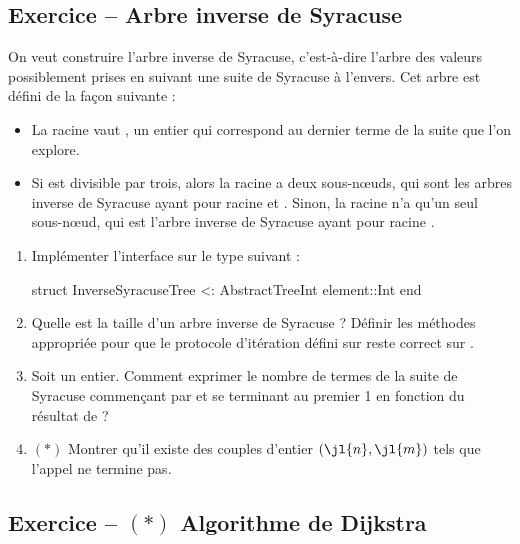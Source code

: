 \documentclass{article}
\newcounter{loop}
\newcounter{numEx}
\newcommand{\exo}[1]{
	\stepcounter{numEx}
	\setcounter{loop}{0}
	\subsection*{Exercice \arabic{numEx} -- #1}
}
\newenvironment{repl}{\vspace{-0.6em}\VerbatimEnvironment\begin{jlrepl}}{\end{jlrepl}}
\begin{document}
\exo{Arbre inverse de Syracuse}

On veut construire l'arbre inverse de Syracuse, c'est-à-dire l'arbre des valeurs possiblement prises en suivant une suite de Syracuse à l'envers. Cet arbre est défini de la façon suivante :
\begin{itemize}
	\item La racine vaut , un entier qui correspond au dernier terme de la suite que l'on explore.
	\item Si  est divisible par trois, alors la racine a deux sous-nœuds, qui sont les arbres inverse de Syracuse ayant pour racine  et . Sinon, la racine n'a qu'un seul sous-nœud, qui est l'arbre inverse de Syracuse ayant pour racine .
\end{itemize}

\begin{enumerate}
	\item Implémenter l'interface  sur le type suivant :
	\begin{repl}
		struct InverseSyracuseTree <: AbstractTree{Int}
			element::Int
		end
	\end{repl}
	
	\item Quelle est la taille d'un arbre inverse de Syracuse ? Définir les méthodes appropriée pour que le protocole d'itération défini sur  reste correct sur .
	
	\item Soit  un entier. Comment exprimer le nombre de termes de la suite de Syracuse commençant par  et se terminant au premier 1 en fonction du résultat de  ?
	
	\item $(*)$ Montrer qu'il existe des couples d'entier $(\jl{n},\jl{m})$ tels que l'appel  ne termine pas.
\end{enumerate}

\exo{$(*)$ Algorithme de Dijkstra}
\end{document}
